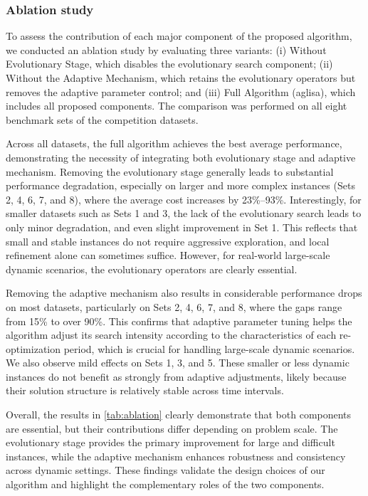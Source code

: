 \documentclass[preprint,12pt]{elsarticle}
\begin{document}
\subsubsection{Ablation study}
To assess the contribution of each major component of the proposed algorithm, we conducted an ablation study by evaluating three variants: (i) Without Evolutionary Stage, which disables the evolutionary search component; (ii) Without the Adaptive Mechanism, which retains the evolutionary operators but removes the adaptive parameter control; and (iii) Full Algorithm (\gls{aglisa}), which includes all proposed components. The comparison was performed on all eight benchmark sets of the competition datasets.

Across all datasets, the full algorithm achieves the best average performance, demonstrating the necessity of integrating both evolutionary stage and adaptive mechanism. Removing the evolutionary stage generally leads to substantial performance degradation, especially on larger and more complex instances (Sets 2, 4, 6, 7, and 8), where the average cost increases by 23\%–93\%. Interestingly, for smaller datasets such as Sets 1 and 3, the lack of the evolutionary search leads to only minor degradation, and even slight improvement in Set 1. This reflects that small and stable instances do not require aggressive exploration, and local refinement alone can sometimes suffice. However, for real-world large-scale dynamic scenarios, the evolutionary operators are clearly essential.

Removing the adaptive mechanism also results in considerable performance drops on most datasets, particularly on Sets 2, 4, 6, 7, and 8, where the gaps range from 15\% to over 90\%. This confirms that adaptive parameter tuning helps the algorithm adjust its search intensity according to the characteristics of each re-optimization period, which is crucial for handling large-scale dynamic scenarios. We also observe mild effects on Sets 1, 3, and 5. These smaller or less dynamic instances do not benefit as strongly from adaptive adjustments, likely because their solution structure is relatively stable across time intervals.

Overall, the results in \autoref{tab:ablation} clearly demonstrate that both components are essential, but their contributions differ depending on problem scale. The evolutionary stage provides the primary improvement for large and difficult instances, while the adaptive mechanism enhances robustness and consistency across dynamic settings. These findings validate the design choices of our algorithm and highlight the complementary roles of the two components.
\end{document}
